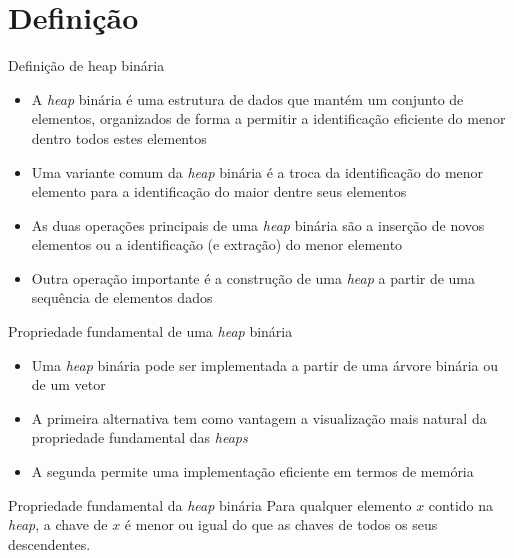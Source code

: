 \section{Definição}

\begin{frame}[fragile]{Definição de heap binária}

    \begin{itemize}
        \item A \textit{heap} binária é uma estrutura de dados que mantém um conjunto de elementos,
            organizados de forma a permitir a identificação eficiente do menor
            dentro todos estes elementos

        \item Uma variante comum da \textit{heap} binária é a troca da identificação do menor
            elemento para a identificação do maior dentre seus elementos

        \item As duas operações principais de uma \textit{heap} binária são a inserção de novos
            elementos ou a identificação (e extração) do menor elemento

        \item Outra operação importante é a construção de uma
            \textit{heap} a partir de uma sequência de elementos dados
    \end{itemize}

\end{frame}

\begin{frame}[fragile]{Propriedade fundamental de uma \textit{heap} binária}

    \begin{itemize}
        \item Uma \textit{heap} binária pode ser implementada a partir de uma árvore binária
            ou de um vetor

        \item A primeira alternativa tem como vantagem a visualização mais natural da 
            propriedade fundamental das \textit{heaps}

        \item A segunda permite uma implementação eficiente em termos de memória
    \end{itemize}

    \begin{block}{Propriedade fundamental da \textit{heap} binária}
        Para qualquer elemento $x$ contido na \textit{heap}, a chave de $x$ é menor ou igual  do
        que as chaves de todos os seus descendentes.
    \end{block}
	
\end{frame}

